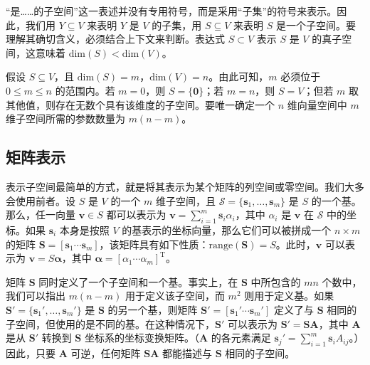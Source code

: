 \documentclass[10pt,a4paper]{book}
\theoremstyle{thmstyle} %
\theoremstyle{defstyle} %
\theoremstyle{prostyle} %
\begin{document}
“是……的子空间”这一表述并没有专用符号，而是采用“子集”的符号来表示。因此，我们用 $Y \subseteq V$ 来表明 $Y$ 是 $V$ 的子集，用 $S \subseteq V$ 来表明 $S$ 是一个子空间。要理解其确切含义，必须结合上下文来判断。表达式 $S \subset V$ 表示 $S$ 是 $V$ 的真子空间，这意味着 $\text{dim}(S) < \text{dim}(V)$。



假设 $S \subseteq V$，且 $\text{dim}(S) = m$，$\text{dim}(V) = n$。由此可知，$m$ 必须位于 $0 \leq m \leq n$ 的范围内。若 $m = 0$，则 $S = \{\mathbf{0}\}$；若 $m = n$，则 $S = V$；但若 $m$ 取其他值，则存在无数个具有该维度的子空间。要唯一确定一个 $n$ 维向量空间中 $m$ 维子空间所需的参数数量为 $m(n - m)$。



\subsection{矩阵表示}





表示子空间最简单的方式，就是将其表示为某个矩阵的列空间或零空间。我们大多会使用前者。设 $S$ 是 $V$ 的一个 $m$ 维子空间，且 $\mathcal{S} = \{\boldsymbol{s}_1, \ldots, \boldsymbol{s}_m\}$ 是 $S$ 的一个基。那么，任一向量 $\boldsymbol{v} \in S$ 都可以表示为 $\boldsymbol{v} = \sum_{i=1}^{m} \boldsymbol{s}_i \alpha_i$，其中 $\alpha_i$ 是 $\boldsymbol{v}$ 在 $\mathcal{S}$ 中的坐标。如果 $\boldsymbol{s}_i$ 本身是按照 $V$ 的基表示的坐标向量，那么它们可以被拼成一个 $n \times m$ 的矩阵 $\boldsymbol{S} = [\boldsymbol{s}_1 \cdots \boldsymbol{s}_m]$，该矩阵具有如下性质：$\text{range}(\boldsymbol{S}) = S$。此时，$\boldsymbol{v}$ 可以表示为 $\boldsymbol{v} = S \boldsymbol{\alpha}$，其中 $\boldsymbol{\alpha} = [\alpha_1 \cdots \alpha_m]^\text{T}$。



矩阵 $\boldsymbol{S}$ 同时定义了一个子空间和一个基。事实上，在 $\boldsymbol{S}$ 中所包含的 $mn$ 个数中，我们可以指出 $m(n-m)$ 用于定义该子空间，而 $m^2$ 则用于定义基。如果 $\boldsymbol{S}'=\{\boldsymbol{s}_1',\ldots,\boldsymbol{s}_m'\}$ 是 $\boldsymbol{S}$ 的另一个基，则矩阵 $\boldsymbol{S}'=[\boldsymbol{s}_1'\cdots\boldsymbol{s}_m']$ 定义了与 $\boldsymbol{S}$ 相同的子空间，但使用的是不同的基。在这种情况下，$\boldsymbol{S}'$ 可以表示为 $\boldsymbol{S}'=\boldsymbol{SA}$，其中 $\boldsymbol{A}$ 是从 $\boldsymbol{S}'$ 转换到 $\boldsymbol{S}$ 坐标系的坐标变换矩阵。（$\boldsymbol{A}$ 的各元素满足 $\boldsymbol{s}_j'=\sum_{i=1}^{m}\boldsymbol{s}_iA_{ij}$。）因此，只要 $\boldsymbol{A}$ 可逆，任何矩阵 $\boldsymbol{SA}$ 都能描述与 $\boldsymbol{S}$ 相同的子空间。
\end{document}
